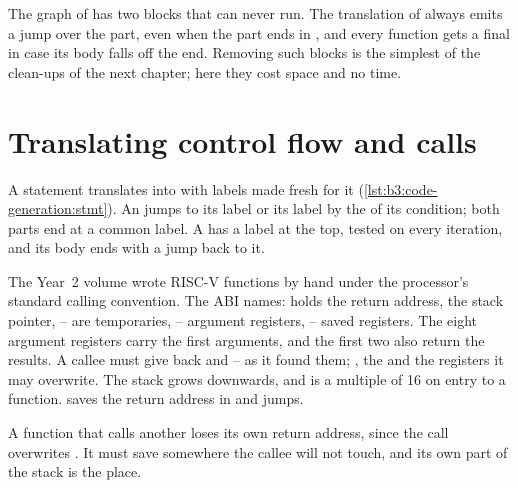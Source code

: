The graph of  has two blocks that can never run. The translation of  always emits a jump over the  part, even when the  part ends in , and every function gets a final  in case its body falls off the end. Removing such blocks is the simplest of the clean-ups of the next chapter; here they cost space and no time.

\section{Translating control flow and calls}\label{sec:b3:code-generation:control}

A statement translates into  with labels made fresh for it (\cref{lst:b3:code-generation:stmt}). An  jumps to its  label or its  label by the  of its condition; both parts end at a common label. A  has a label at the top, tested on every iteration, and its body ends with a jump back to it.

\label{lst:b3:code-generation:stmt}

\begin{recall}
The Year~2 volume wrote RISC-V functions by hand under the processor's standard calling convention. The ABI names:  holds the return address,  the stack pointer, -- are temporaries, -- argument registers, -- saved registers. %
The eight argument registers carry the first arguments, and the first two also return the results. %
A callee must give back  and -- as it found them; , the  and the  registers it may overwrite. %
The stack grows downwards, and  is a multiple of 16 on entry to a function. %
 saves the return address in  and jumps. %
\end{recall}

A function that calls another loses its own return address, since the call overwrites . It must save  somewhere the callee will not touch, and its own part of the stack is the place.

